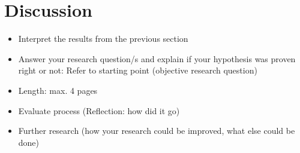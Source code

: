 \documentclass[]{report}
\begin{document}
	
\section{Discussion}
\begin{itemize}
	\item Interpret the results from the previous section
	\item Answer your research question/s and explain if your hypothesis was proven right or not: Refer to starting point (objective research question)

	\item Length: max. 4 pages
	\item Evaluate process (Reflection: how did it go)
	\item Further research (how your research could be improved, what else could be done)
\end{itemize}
\end{document}
